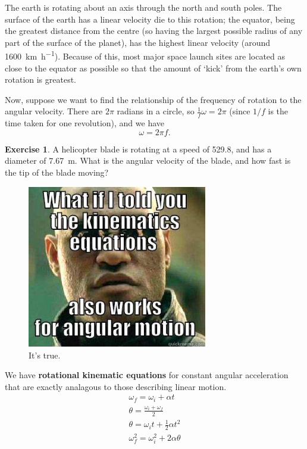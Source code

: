 \documentclass[a4paper]{amsbook}
\theoremstyle{definition}
\newtheorem{exercise}{Exercise}
\numberwithin{exercise}{chapter}
\numberwithin{exercise}{chapter}
\begin{document}
The earth is rotating about an axis through the north and south poles. The surface of the earth has a linear velocity die to this
rotation; the equator, being the greatest distance from the centre (so having the largest possible radius of any part of the surface
of the planet), has the highest linear velocity (around \SI{1600}{\kilo\metre\per\hour}). Because of this, most major space launch
sites are located as close to the equator as possible so that the amount of `kick' from the earth's own rotation is greatest.

Now, suppose we want to find the relationship of the frequency of rotation to the angular velocity. There are $ 2\pi $ radians
in a circle, so $ \frac{1}{f} \omega = 2\pi $ (since $ 1/f $ is the time taken for one revolution), and we have
\begin{equation}
  \omega = 2\pi f.
\end{equation}

\begin{exercise}
  A helicopter blade is rotating at a speed of \SI{529.8}{\rpm}, and has a diameter of \SI{7.67}{\metre}. What is the angular
  velocity of the blade, and how fast is the tip of the blade moving?
\end{exercise}

\begin{figure}
  \centering
  \includegraphics[width=0.7\textwidth]{kinematics}
  \caption{It's true.\label{fig:kinematics}}
\end{figure}

We have \textbf{rotational kinematic equations} for constant angular acceleration that are exactly analagous to those describing linear motion.
\begin{gather}
  \omega_f = \omega_i + \alpha t\\
  \theta = \frac{\omega_i + \omega_f}{2}\\
  \theta = \omega_i t + \frac{1}{2} \alpha t^2\\
  \omega_f^2 = \omega_i^2 + 2 \alpha \theta
\end{gather}
\end{document}
